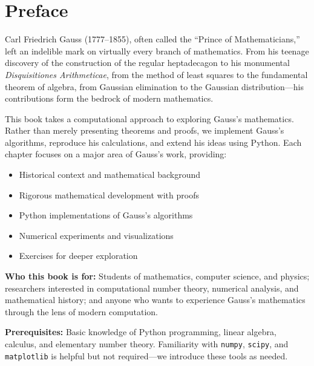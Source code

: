 \documentclass[12pt,oneside]{book}
\begin{document}
\cleardoublepage

\chapter*{Preface}

Carl Friedrich Gauss (1777--1855), often called the ``Prince of Mathematicians,'' left an indelible mark on virtually every branch of mathematics. From his teenage discovery of the construction of the regular heptadecagon to his monumental \textit{Disquisitiones Arithmeticae}, from the method of least squares to the fundamental theorem of algebra, from Gaussian elimination to the Gaussian distribution---his contributions form the bedrock of modern mathematics.

This book takes a computational approach to exploring Gauss's mathematics. Rather than merely presenting theorems and proofs, we implement Gauss's algorithms, reproduce his calculations, and extend his ideas using Python. Each chapter focuses on a major area of Gauss's work, providing:

\begin{itemize}
    \item Historical context and mathematical background
    \item Rigorous mathematical development with proofs
    \item Python implementations of Gauss's algorithms
    \item Numerical experiments and visualizations
    \item Exercises for deeper exploration
\end{itemize}

\textbf{Who this book is for:} Students of mathematics, computer science, and physics; researchers interested in computational number theory, numerical analysis, and mathematical history; and anyone who wants to experience Gauss's mathematics through the lens of modern computation.

\textbf{Prerequisites:} Basic knowledge of Python programming, linear algebra, calculus, and elementary number theory. Familiarity with \texttt{numpy}, \texttt{scipy}, and \texttt{matplotlib} is helpful but not required---we introduce these tools as needed.
\end{document}
